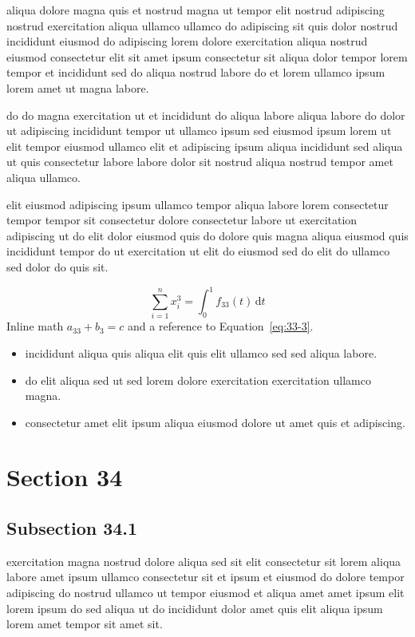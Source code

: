 \documentclass{article}
\begin{document}
aliqua dolore magna quis et nostrud magna ut tempor elit nostrud adipiscing nostrud exercitation aliqua ullamco ullamco do adipiscing sit quis dolor nostrud incididunt eiusmod do adipiscing lorem dolore exercitation aliqua nostrud eiusmod consectetur elit sit amet ipsum consectetur sit aliqua dolor tempor lorem tempor et incididunt sed do aliqua nostrud labore do et lorem ullamco ipsum lorem amet ut magna labore.

do do magna exercitation ut et incididunt do aliqua labore aliqua labore do dolor ut adipiscing incididunt tempor ut ullamco ipsum sed eiusmod ipsum lorem ut elit tempor eiusmod ullamco elit et adipiscing ipsum aliqua incididunt sed aliqua ut quis consectetur labore labore dolor sit nostrud aliqua nostrud tempor amet aliqua ullamco.

elit eiusmod adipiscing ipsum ullamco tempor aliqua labore lorem consectetur tempor tempor sit consectetur dolore consectetur labore ut exercitation adipiscing ut do elit dolor eiusmod quis do dolore quis magna aliqua eiusmod quis incididunt tempor do ut exercitation ut elit do eiusmod sed do elit do ullamco sed dolor do quis sit.

\begin{equation}\label{eq:33-3}
  \sum_{i=1}^{n} x_i^{3} = \int_0^1 f_{33}(t)\,\mathrm{d}t
\end{equation}
Inline math $a_{33} + b_{3} = c$ and a reference to Equation~\eqref{eq:33-3}.

\begin{itemize}
  \item incididunt aliqua quis aliqua elit quis elit ullamco sed sed aliqua labore.
  \item do elit aliqua sed ut sed lorem dolore exercitation exercitation ullamco magna.
  \item consectetur amet elit ipsum aliqua eiusmod dolore ut amet quis et adipiscing.
\end{itemize}

\section{Section 34}\label{sec:34}
\subsection{Subsection 34.1}\label{sec:34-1}
exercitation magna nostrud dolore aliqua sed sit elit consectetur sit lorem aliqua labore amet ipsum ullamco consectetur sit et ipsum et eiusmod do dolore tempor adipiscing do nostrud ullamco ut tempor eiusmod et aliqua amet amet ipsum elit lorem ipsum do sed aliqua ut do incididunt dolor amet quis elit aliqua ipsum lorem amet tempor sit amet sit.
\end{document}
